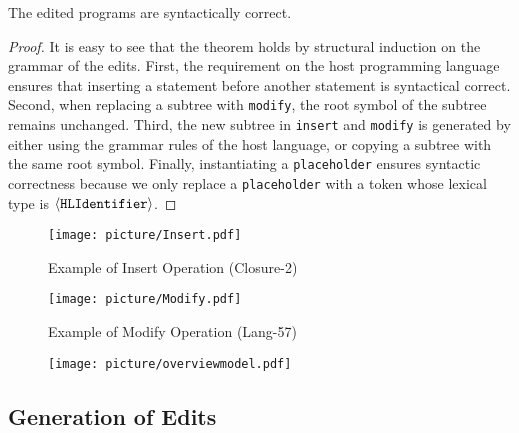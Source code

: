 \begin{theorem}
    The edited programs are syntactically correct. 
\end{theorem}
\begin{proof}
It is easy to see that the theorem holds by structural induction on the grammar of the edits. First, the requirement on the host programming language ensures that inserting a statement before another statement is syntactical correct. Second, when replacing a subtree with {\tt modify}, the root symbol of the subtree remains unchanged. Third, the new subtree in {\tt insert} and {\tt modify} is generated by either using the grammar rules of the host language, or copying a subtree with the same root symbol. Finally, instantiating a {\tt placeholder} ensures syntactic correctness because we only replace a {\tt placeholder} with a token whose lexical type is $\tt \langle HLIdentifier\rangle$.
\end{proof}

\begin{figure}
    \centering
    \texttt{[image: picture/Insert.pdf]}
    \vspace{-6mm}
    \caption{Example of Insert Operation (Closure-2)}
    \vspace{-2mm}
    \label{fig:insert}
\end{figure}

\begin{figure}
    \centering
    \texttt{[image: picture/Modify.pdf]}                            \vspace{-8mm}

    \caption{Example of Modify Operation (Lang-57)}
    \label{fig:modify}
\end{figure}
\begin{figure*}
    \centering
    \texttt{[image: picture/overviewmodel.pdf]}
                            \vspace{-9mm}
    \caption{}\vspace{-2mm}
    \label{fig:overview-model}
\end{figure*}
\subsection{Generation of Edits}

